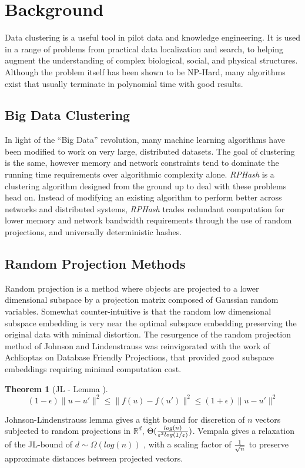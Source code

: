 \documentclass[a4paper,10pt]{article}
\newtheorem{Theorem}{Theorem}[section]
\begin{document}
\section{Background} Data clustering is a useful tool in pilot data and
knowledge engineering.	It is used in a range of problems from practical
data localization and search, to helping augment the understanding of complex
biological, social, and physical structures.  Although the problem itself has
been shown to be NP-Hard\cite{dasgupta08,Mahajan09}, many algorithms exist that
usually terminate in polynomial time with good results.  \subsection{Big Data
Clustering} In light of the ``Big Data'' revolution, many machine learning
algorithms have been modified to work on very large, distributed datasets.
The goal of clustering is the same, however memory and network constraints tend
to dominate the running time requirements over algorithmic complexity alone.
\emph{RPHash} is a clustering algorithm designed from the ground up to deal
with these problems head on.  Instead of modifying an existing algorithm to
perform better across networks and distributed systems, \emph{RPHash} trades
redundant computation for lower memory and network bandwidth requirements
through the use of random projections, and universally deterministic hashes.
\subsection{Random Projection Methods} Random projection is a method where
objects are projected to a lower dimensional subspace by a projection
matrix composed of Gaussian random variables.  Somewhat counter-intuitive
is that the random low dimensional subspace embedding is very near the
optimal subspace embedding preserving the original data with minimal
distortion\cite{bourgain1985lipschitz}.  The resurgence of the random
projection method of Johnson and Lindenstrauss was reinvigorated with the
work of Achlioptas on Database Friendly Projections\cite{Achlioptas01},
that provided good subspace embeddings requiring minimal computation cost.
\begin{Theorem}[JL - Lemma \cite{vempala}]
 $$
(1-\epsilon) \|u-u'\|^2 \leq \|f(u)-f(u')\|^2 \leq (1+\epsilon) \| u-u' \|^2
$$
\end{Theorem}
Johnson-Lindenstrauss lemma gives a tight bound for discretion of $n$ vectors
subjected to random projections in $\mathbb{R}^d$, $\Theta( {{log(n)}\over
  {\varepsilon^2 log(1/\varepsilon) }})$.
Vempala gives a relaxation of the JL-bound of $d \sim \Omega(log(n))$
\cite{vempala}, with a scaling factor of ${{1}\over{\sqrt{n}}}$ to preserve
approximate distances between projected vectors.
\end{document}
